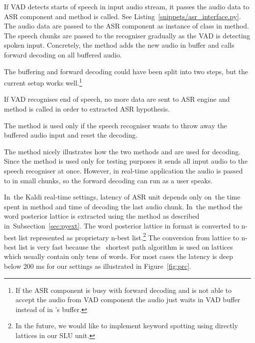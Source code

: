 If \ac{VAD} detects starts of speech in input audio stream, it passes the audio data to \ac{ASR} component and  method is called. 
See Listing~\ref{snippets/asr_interface.py}.
The audio data are passed to the ASR component as instance of class  in  method.
The speech chunks are passed to the recogniser gradually as the \ac{VAD} is detecting spoken input.
Concretely, the method  adds the new audio in  buffer and calls forward decoding on all buffered audio.

The buffering and forward decoding could have been split into two steps, but the current setup works well.\footnote{If the \ac{ASR} component is busy with forward decoding and is not able to accept the audio from \ac{VAD} component the audio just waits in \ac{VAD} buffer instead of in 's buffer.}

If \ac{VAD} recognises end of speech, no more data are sent to \ac{ASR} engine and  method is called in order to extracted \ac{ASR} hypothesis.


The  method is used only if the speech recogniser wants to throw away the buffered audio input and reset the decoding.


The method  nicely illustrates how the two methods  and  are used for decoding. 
Since the method is used only for testing purposes it sends all input audio to the speech recogniser at once.
However, in real-time application the audio is passed to  in small chunks, so the forward decoding can run as a user speaks. 

In~the Kaldi real-time settings, latency of \ac{ASR} unit depends only on~the time spent in  method and time of decoding the last audio chunk.
In~the  method the word posterior lattice is extracted using the  method as described in~Subsection~\ref{sec:pyext}. 
The word posterior lattice in  format is converted to n-best list represented as proprietary  n-best list.\footnote{In the future, we would like to implement keyword spotting using directly  lattices in our \ac{SLU} unit.}
The conversion from lattice to n-best list is very fast because the~ shortest path algorithm is used on lattices which usually contain only tens of words.
For most cases the latency is deep below 200 ms for our settings as illustrated in Figure~\ref{fig:prc}.

